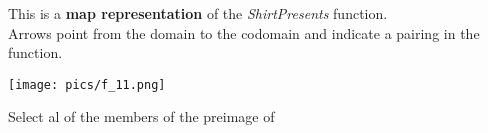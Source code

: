 \documentclass{ximera}
\author{Lee Wayand}
\begin{document}
\begin{exercise}





This is a \textbf{map representation} of the \textit{ShirtPresents} function. \\

Arrows point from the domain to the codomain and indicate a pairing in the function.

\begin{image}
\texttt{[image: pics/f\_11.png]}
\end{image}










Select al of the members of the preimage of \large{  \large}



\begin{selectAll}
\end{selectAll}














\end{exercise}
\end{document}
